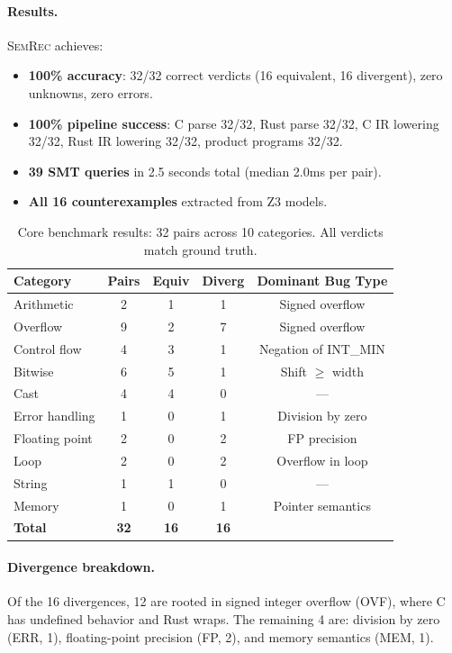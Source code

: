 \documentclass[11pt,a4paper]{article}
\begin{document}
\paragraph{Results.} \textsc{SemRec} achieves:
\begin{itemize}
  \item \textbf{100\% accuracy}: 32/32 correct verdicts (16 equivalent,
    16 divergent), zero unknowns, zero errors.
  \item \textbf{100\% pipeline success}: C parse 32/32, Rust parse 32/32,
    C IR lowering 32/32, Rust IR lowering 32/32, product programs 32/32.
  \item \textbf{39 SMT queries} in 2.5 seconds total (median 2.0ms per pair).
  \item \textbf{All 16 counterexamples} extracted from Z3 models.
\end{itemize}

\begin{table}[t]
\centering
\small
\caption{Core benchmark results: 32 pairs across 10 categories.
All verdicts match ground truth.}
\label{tab:core-results}
\begin{tabular}{@{}lcccc@{}}
\toprule
Category & Pairs & Equiv & Diverg & Dominant Bug Type \\
\midrule
Arithmetic       & 2 & 1 & 1 & Signed overflow \\
Overflow         & 9 & 2 & 7 & Signed overflow \\
Control flow     & 4 & 3 & 1 & Negation of INT\_MIN \\
Bitwise          & 6 & 5 & 1 & Shift $\geq$ width \\
Cast             & 4 & 4 & 0 & --- \\
Error handling   & 1 & 0 & 1 & Division by zero \\
Floating point   & 2 & 0 & 2 & FP precision \\
Loop             & 2 & 0 & 2 & Overflow in loop \\
String           & 1 & 1 & 0 & --- \\
Memory           & 1 & 0 & 1 & Pointer semantics \\
\midrule
\textbf{Total}   & \textbf{32} & \textbf{16} & \textbf{16} & \\
\bottomrule
\end{tabular}
\end{table}

\paragraph{Divergence breakdown.}
Of the 16 divergences, 12 are rooted in signed integer overflow (OVF),
where C has undefined behavior and Rust wraps.  The remaining 4 are:
division by zero (ERR, 1), floating-point precision (FP, 2), and
memory semantics (MEM, 1).
\end{document}
